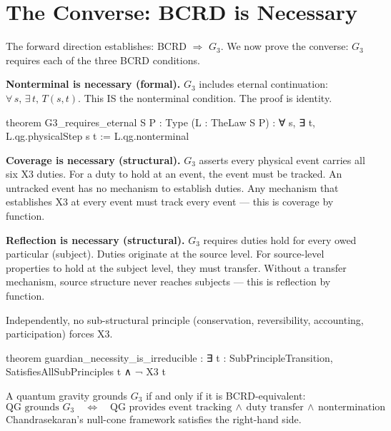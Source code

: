 \section{The Converse: BCRD is Necessary}\label{sec:converse}

The forward direction establishes: BCRD $\Rightarrow$ $G_3$. We now prove the converse: $G_3$ requires each of the three BCRD conditions.

\textbf{Nonterminal is necessary (formal).} $G_3$ includes eternal continuation: $\forall\, s,\, \exists\, t,\, T(s,t)$. This IS the nonterminal condition. The proof is identity.

\begin{leancode}
theorem G3_requires_eternal {S P : Type} (L : TheLaw S P) :
    ∀ s, ∃ t, L.qg.physicalStep s t :=
  L.qg.nonterminal
\end{leancode}

\textbf{Coverage is necessary (structural).} $G_3$ asserts every physical event carries all six X3 duties. For a duty to hold at an event, the event must be tracked. An untracked event has no mechanism to establish duties. Any mechanism that establishes X3 at every event must track every event --- this is coverage by function.

\textbf{Reflection is necessary (structural).} $G_3$ requires duties hold for every owed particular (subject). Duties originate at the source level. For source-level properties to hold at the subject level, they must transfer. Without a transfer mechanism, source structure never reaches subjects --- this is reflection by function.

\begin{theorem}\label{thm:irreducible}
Independently, no sub-structural principle (conservation, reversibility, accounting, participation) forces X3.
\end{theorem}

\begin{leancode}
theorem guardian_necessity_is_irreducible :
    ∃ t : SubPrincipleTransition,
      SatisfiesAllSubPrinciples t ∧ ¬ X3 t
\end{leancode}

\begin{theorem}[Characterisation]\label{thm:iff}
A quantum gravity grounds $G_3$ if and only if it is BCRD-equivalent:
\[
\text{QG grounds } G_3 \quad\Longleftrightarrow\quad \text{QG provides event tracking} \,\wedge\, \text{duty transfer} \,\wedge\, \text{nontermination}
\]
Chandrasekaran's null-cone framework satisfies the right-hand side.
\end{theorem}

